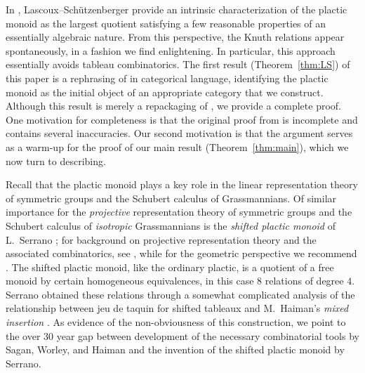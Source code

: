 \documentclass[12 pt]{amsart}
\theoremstyle{remark}
\numberwithin{equation}{section}
\begin{document}
In \cite[Th\'eor\`eme~2.16]{Lascoux.Schutzenberger:plaxique}, Lascoux--Sch\"utzenberger provide an intrinsic characterization of the plactic monoid as the largest quotient satisfying a few reasonable properties of an essentially algebraic nature. From this perspective, the Knuth relations appear spontaneously, in a fashion we find enlightening. In particular, this approach essentially avoids tableau combinatorics. The first result (Theorem~\ref{thm:LS}) of this paper is a rephrasing of \cite[Th\'eor\`eme~2.16]{Lascoux.Schutzenberger:plaxique} in categorical language, identifying the plactic monoid as the initial object of an appropriate category that we construct. Although this result is merely a repackaging of \cite[Th\'eor\`eme~2.16]{Lascoux.Schutzenberger:plaxique}, we provide a complete proof. One motivation for completeness is that the original proof from \cite{Lascoux.Schutzenberger:plaxique} is incomplete and contains several inaccuracies. Our second motivation is that the argument  serves as a warm-up for the proof of our main result (Theorem~\ref{thm:main}), which we now turn to describing.


Recall that the plactic monoid plays a key role in the linear representation theory of symmetric groups and the Schubert calculus of Grassmannians. Of similar importance for the \emph{projective} representation theory of symmetric groups and the Schubert calculus of \emph{isotropic} Grassmannians is the \emph{shifted plactic monoid} of L.~Serrano \cite{Serrano}; for background on projective representation theory and the associated combinatorics, see \cite{Hoffman.Humphreys}, while for the geometric perspective we recommend \cite[\S 6]{Gillespie}. The shifted plactic monoid, like the ordinary plactic, is a quotient of a free monoid by certain homogeneous equivalences, in this case $8$ relations of degree $4$. Serrano obtained these relations through a somewhat complicated analysis of the relationship between jeu de taquin for shifted tableaux \cite{Worley, Sagan} and M.~Haiman's \emph{mixed insertion} \cite{Haiman}. As evidence of the non-obviousness of this construction, we point to the over $30$ year gap between development of the necessary combinatorial tools by Sagan, Worley, and Haiman and the invention of the shifted plactic monoid by Serrano.
\end{document}
